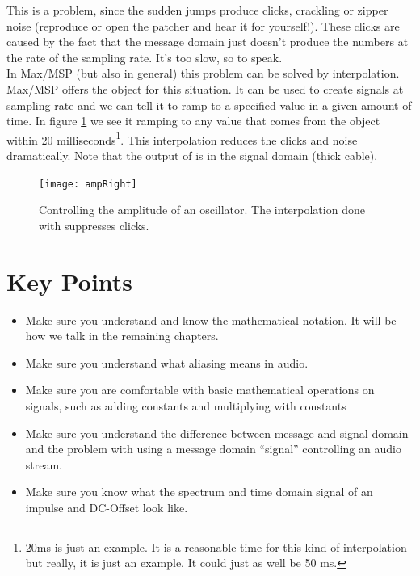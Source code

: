 This is a problem, since the sudden jumps produce clicks, crackling or zipper noise (reproduce or open the patcher and hear it for yourself!). These clicks are caused by the fact that the message domain just doesn't produce
the numbers at the rate of the sampling rate. It's too slow, so to speak.\\
In Max/MSP (but also in general) this problem can be solved by interpolation. Max/MSP offers the  object for this situation. It can be used to create signals at sampling rate and we can tell it to ramp to a specified value in a given amount of time. In figure \ref{fig:ampRight} we see it ramping to any value that comes from the  object within 20 milliseconds\footnote{20ms is just an example. It is a reasonable time for this kind of interpolation but really, it is just an example. It could just as well be 50 ms.}. This interpolation reduces the clicks and noise dramatically. Note that the output of  is in the signal domain (thick cable).

\begin{figure}[H]
	\centering
	\texttt{[image: ampRight]}
	\caption[Amplitude control, signal domain]
	{Controlling the amplitude of an oscillator. The interpolation done with  suppresses clicks. }
	\label{fig:ampRight}
\end{figure}


\section{Key Points}
\begin{itemize}
	\item Make sure you understand and know the mathematical notation. It will be how we talk in the remaining chapters.
	\item Make sure you understand what aliasing means in audio.
	\item Make sure you are comfortable with basic mathematical operations on signals, such as adding constants and multiplying with constants
	\item Make sure you understand the difference between message and signal domain and the problem with using a message domain ``signal'' controlling an audio stream.
	\item Make sure you know what the spectrum and time domain signal of an impulse and DC-Offset look like.
\end{itemize}
